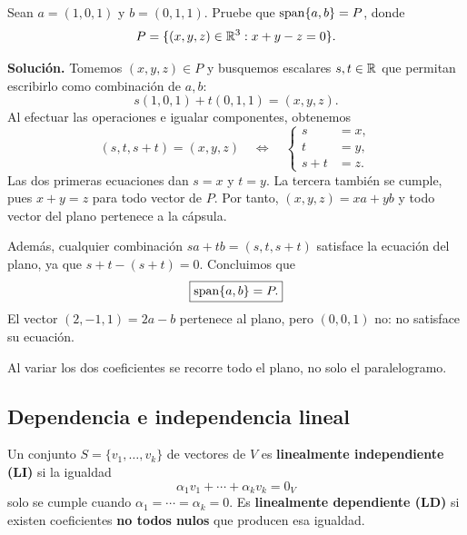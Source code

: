 \documentclass[compacto,10pt]{pubciencias-notas}
\begin{document}
\begin{ejem}[Un plano en $\R^3$]\label{sem07cl02:plano}
    Sean $a=(1,0,1)$ y $b=(0,1,1)$. Pruebe que
    $\operatorname{span}\{a,b\}=P$, donde
    \[
        P=\{(x,y,z)\in\mathbb{R}^3:x+y-z=0\}.
    \]

    \textbf{Solución.} Tomemos $(x,y,z)\in P$ y busquemos escalares
    $s,t\in\mathbb{R}$ que permitan escribirlo como combinación de $a,b$:
    \[
        s(1,0,1)+t(0,1,1)=(x,y,z).
    \]
    Al efectuar las operaciones e igualar componentes, obtenemos
    \[
        (s,t,s+t)=(x,y,z)
        \quad\Longleftrightarrow\quad
        \left\{\begin{aligned}s&=x,\\t&=y,\\s+t&=z.\end{aligned}\right.
    \]
    Las dos primeras ecuaciones dan $s=x$ y $t=y$. La tercera también
    se cumple, pues $x+y=z$ para todo vector de $P$. Por tanto,
    $(x,y,z)=xa+yb$ y todo vector del plano pertenece a la cápsula.

    Además, cualquier combinación $sa+tb=(s,t,s+t)$ satisface la
    ecuación del plano, ya que $s+t-(s+t)=0$. Concluimos que
    \[
        \boxed{\operatorname{span}\{a,b\}=P.}
    \]
    El vector $(2,-1,1)=2a-b$ pertenece al plano, pero $(0,0,1)$ no:
    no satisface su ecuación.
\end{ejem}
\begin{center}

    Al variar los dos coeficientes se recorre todo el plano, no solo el paralelogramo.
\end{center}

\subsection{Dependencia e independencia lineal}
\begin{defi}\label{sem07cl02:independencia}
    Un conjunto $S=\{v_1,\ldots,v_k\}$ de vectores de $V$ es
    \textbf{linealmente independiente (LI)} si la igualdad
    \[
        \alpha_1v_1+\cdots+\alpha_kv_k=0_V
    \]
    solo se cumple cuando $\alpha_1=\cdots=\alpha_k=0$.
    Es \textbf{linealmente dependiente (LD)} si existen coeficientes
    \textbf{no todos nulos} que producen esa igualdad.
\end{defi}
\end{document}
